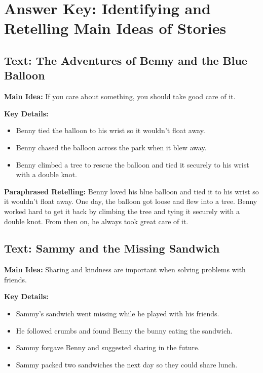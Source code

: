 \documentclass[12pt]{article}
\begin{document}
\section*{Answer Key: Identifying and Retelling Main Ideas of Stories}

\subsection*{Text: The Adventures of Benny and the Blue Balloon}

\textbf{Main Idea:} If you care about something, you should take good care of it.

\textbf{Key Details:}
\begin{itemize}
    \item Benny tied the balloon to his wrist so it wouldn’t float away.
    \item Benny chased the balloon across the park when it blew away.
    \item Benny climbed a tree to rescue the balloon and tied it securely to his wrist with a double knot.
\end{itemize}

\textbf{Paraphrased Retelling:} Benny loved his blue balloon and tied it to his wrist so it wouldn’t float away. One day, the balloon got loose and flew into a tree. Benny worked hard to get it back by climbing the tree and tying it securely with a double knot. From then on, he always took great care of it.

\vspace{1em}

\subsection*{Text: Sammy and the Missing Sandwich}

\textbf{Main Idea:} Sharing and kindness are important when solving problems with friends.

\textbf{Key Details:}
\begin{itemize}
    \item Sammy’s sandwich went missing while he played with his friends.
    \item He followed crumbs and found Benny the bunny eating the sandwich.
    \item Sammy forgave Benny and suggested sharing in the future.
    \item Sammy packed two sandwiches the next day so they could share lunch.
\end{itemize}
\end{document}
